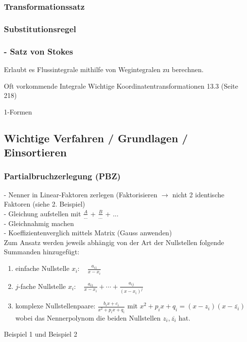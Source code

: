 \documentclass[6pt]{article}
\begin{document}
\begin{multicols*}{3}
	\subsubsection*{Transformationssatz}
	\subsubsection*{Substitutionsregel}


		\subsubsection*{- Satz von Stokes}
		Erlaubt es Flussintegrale mithilfe von Wegintegralen zu berechnen.
		
	
	
	Oft vorkommende Integrale
	Wichtige Koordinatentransformationen 13.3 (Seite 218)
	

1-Formen











\pagebreak
\subsection*{Wichtige Verfahren / Grundlagen / Einsortieren}
\subsubsection*{Partialbruchzerlegung (PBZ)}
- Nenner in Linear-Faktoren zerlegen (Faktorisieren $\rightarrow$ nicht 2 identische Faktoren (siehe 2. Beispiel) \\
- Gleichung aufstellen mit $\frac{A}{...}$ + $\frac{B}{...}$ + ... \\
- Gleichnahmig machen \\
- Koeffizientenverglich mittels Matrix (Gauss anwenden) \\

Zum Ansatz werden jeweils abhängig von der Art der Nullstellen folgende Summanden hinzugefügt:
			\begin{enumerate}
				\item einfache Nullstelle $x_i: \quad \frac{a_{i1}}{x-x_i}$
				\item $j$-fache Nullstelle $x_i: \quad \frac{a_{i1}}{x-x_i} + \cdots + \frac{a_{ij}}{(x-x_i)^j} $
				\item
				komplexe Nullstellenpaare: $ \frac{b_ix + c_i}{x^2+p_ix+q_i}$ mit $x^2+p_ix+q_i = (x-z_i)(x- \overline{z_i})$
				wobei das Nennerpolynom die beiden Nullstellen $z_i, \overline{z_i}$ hat.
			\end{enumerate}



Beispiel 1 und Beispiel 2 




\end{multicols*}
\end{document}
